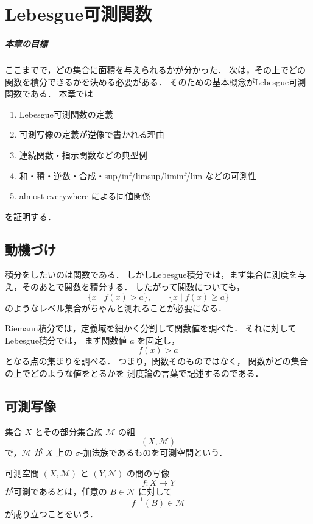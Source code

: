 \chapter{Lebesgue可測関数}

\paragraph{本章の目標}
ここまでで，どの集合に面積を与えられるかが分かった．
次は，その上でどの関数を積分できるかを決める必要がある．
そのための基本概念がLebesgue可測関数である．
本章では
\begin{enumerate}
    \item Lebesgue可測関数の定義
    \item 可測写像の定義が逆像で書かれる理由
    \item 連続関数・指示関数などの典型例
    \item 和・積・逆数・合成・sup/inf/limsup/liminf/lim などの可測性
    \item almost everywhere による同値関係
\end{enumerate}
を証明する．

\section{動機づけ}

積分をしたいのは関数である．
しかしLebesgue積分では，まず集合に測度を与え，そのあとで関数を積分する．
したがって関数についても，
\[
\{x \mid f(x)>a\},\qquad
\{x \mid f(x)\ge a\}
\]
のようなレベル集合がちゃんと測れることが必要になる．

Riemann積分では，定義域を細かく分割して関数値を調べた．
それに対してLebesgue積分では，
まず関数値 $a$ を固定し，
\[
f(x)>a
\]
となる点の集まりを調べる．
つまり，関数そのものではなく，
関数がどの集合の上でどのような値をとるかを
測度論の言葉で記述するのである．

\section{可測写像}

\begin{definition}[可測空間]
集合 $X$ とその部分集合族 $\mathcal M$ の組
\[
(X,\mathcal M)
\]
で，$\mathcal M$ が $X$ 上の $\sigma$-加法族であるものを可測空間という．
\end{definition}

\begin{definition}[可測写像]
可測空間 $(X,\mathcal M)$ と $(Y,\mathcal N)$ の間の写像
\[
f:X\to Y
\]
が可測であるとは，任意の $B \in \mathcal N$ に対して
\[
f^{-1}(B)\in \mathcal M
\]
が成り立つことをいう．
\end{definition}


